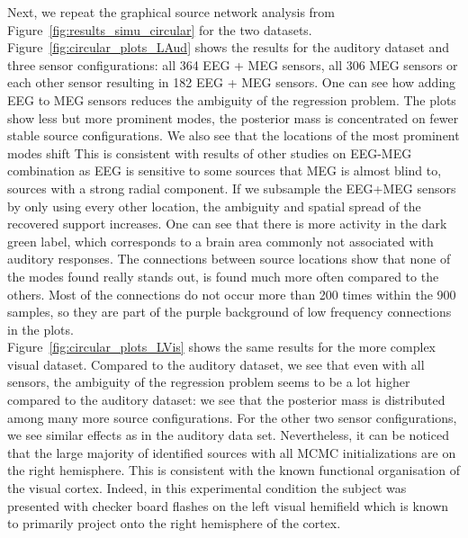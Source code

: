 Next, we repeat the graphical source network analysis from Figure~\ref{fig:results_simu_circular} for the two datasets. Figure~\ref{fig:circular_plots_LAud} shows the results for the auditory dataset and three sensor configurations: all 364 EEG + MEG sensors, all 306 MEG sensors or each other sensor resulting in 182 EEG + MEG sensors. One can see how adding EEG to MEG sensors reduces the ambiguity of the regression problem. The plots show less but more prominent modes, \ie the posterior mass is concentrated on fewer stable source configurations. We also see that the locations of the most prominent modes shift
This is consistent with results of other studies on EEG-MEG combination \cite{MoStBrHa08,Lu14,AyVoKuHeKuGaHaWeKeRaWoHe14} as EEG is sensitive to some sources that MEG is almost blind to, \eg sources with a strong radial component. If we subsample the EEG+MEG sensors by only using every other location, the ambiguity and spatial spread of the recovered support increases. One can see that there is more activity in the dark green label, which corresponds to a brain area commonly not associated with auditory responses.%
The connections between source locations show that none of the modes found really stands out, \ie is found much more often compared to the others. Most of the connections do not occur more than 200 times within the 900 samples, so they are part of the purple background of low frequency connections in the plots.\\
Figure~\ref{fig:circular_plots_LVis} shows the same results for the more complex visual dataset. Compared to the auditory dataset, we see that even with all sensors, the ambiguity of the regression problem seems to be a lot higher compared to the auditory dataset: we see that the posterior mass is distributed among many more source configurations. For the other two sensor configurations, we see similar effects as in the auditory data set. Nevertheless, it can be noticed that the large majority of identified sources with all MCMC initializations are on the right hemisphere. This is consistent with the known functional organisation of the visual cortex. Indeed, in this experimental condition the subject was presented with checker board flashes on the left visual hemifield which is known to primarily project onto the right hemisphere of the cortex.


